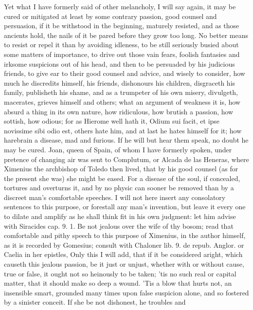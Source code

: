 Yet what I have formerly said of other melancholy, I will say again, it
may be cured or mitigated at least by some contrary passion, good
counsel and persuasion, if it be withstood in the beginning, maturely
resisted, and as those ancients hold, the nails of it be pared
before they grow too long. No better means to resist or repel it than
by avoiding idleness, to be still seriously busied about some matters
of importance, to drive out those vain fears, foolish fantasies and
irksome suspicions out of his head, and then to be persuaded by his
judicious friends, to give ear to their good counsel and advice, and
wisely to consider, how much he discredits himself, his friends,
dishonours his children, disgraceth his family, publisheth his shame,
and as a trumpeter of his own misery, divulgeth, macerates, grieves
himself and others; what an argument of weakness it is, how absurd a
thing in its own nature, how ridiculous, how brutish a passion, how
sottish, how odious; for as Hierome well hath it, Odium sui
facit, et ipse novissime sibi odio est, others hate him, and at last he
hates himself for it; how harebrain a disease, mad and furious. If he
will but hear them speak, no doubt he may be cured. Joan, queen
of Spain, of whom I have formerly spoken, under pretence of changing
air was sent to Complutum, or Alcada de las Heneras, where Ximenius the
archbishop of Toledo then lived, that by his good counsel (as for the
present she was) she might be eased. For a disease of the soul,
if concealed, tortures and overturns it, and by no physic can sooner be
removed than by a discreet man's comfortable speeches. I will not here
insert any consolatory sentences to this purpose, or forestall any
man's invention, but leave it every one to dilate and amplify as he
shall think fit in his own judgment: let him advise with Siracides cap.
9. 1. Be not jealous over the wife of thy bosom; read that comfortable
and pithy speech to this purpose of Ximenius, in the author himself, as
it is recorded by Gomesius; consult with Chaloner lib. 9. de repub.
Anglor. or Caelia in her epistles, \etc{} Only this I will add, that if it
be considered aright, which causeth this jealous passion, be it just or
unjust, whether with or without cause, true or false, it ought not so
heinously to be taken; 'tis no such real or capital matter, that it
should make so deep a wound. 'Tis a blow that hurts not, an insensible
smart, grounded many times upon false suspicion alone, and so fostered
by a sinister conceit. If she be not dishonest, he troubles and
